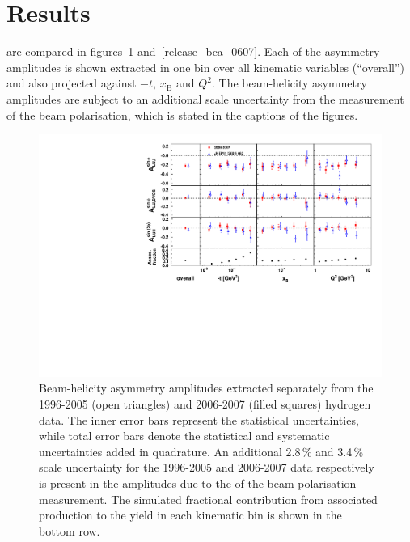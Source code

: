 \section{Results}
 are compared in figures~\ref{release_bsa_0607} and~\ref{release_bca_0607}. Each of the asymmetry amplitudes is shown extracted in one bin over all kinematic variables (``overall'') and also projected against $-t$, $x_{\textrm{B}}$ and $Q^{2}$. The beam-helicity asymmetry amplitudes are subject to an additional scale uncertainty from the measurement of the beam polarisation, which is stated in the captions of the figures.
\begin{figure}
\begin{center}
\includegraphics[width=15cm,keepaspectratio]{bsadvcsplots_eml_par13_bin6_pic_0607_9605_cluster_dual}
  \caption{Beam-helicity asymmetry amplitudes extracted separately from
the 1996-2005 (open triangles) and 2006-2007 (filled squares)
hydrogen data. The inner error bars represent the statistical uncertainties, while total error bars denote the statistical and systematic uncertainties added in quadrature.  
An additional 2.8\,\% and 3.4\,\% scale uncertainty for the 1996-2005 and
2006-2007 data respectively is present in the amplitudes due to the  of
the beam polarisation measurement. The simulated fractional contribution from associated production to the yield in each kinematic bin is shown in the bottom row.}
 \label{release_bsa_0607}
\end{center}
 \end{figure}

